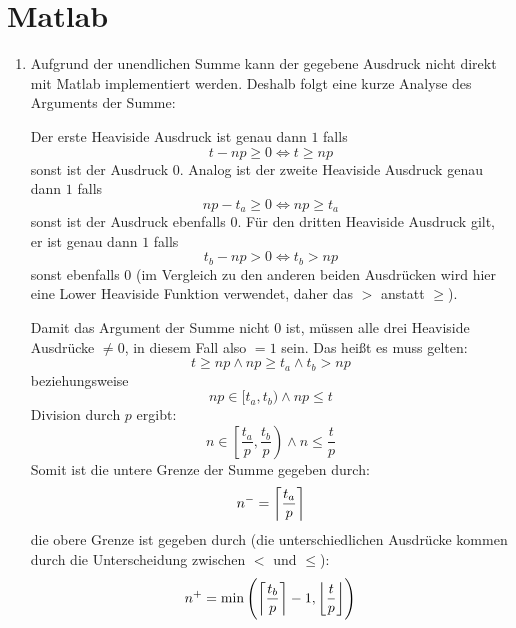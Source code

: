 \documentclass[DIN, pagenumber=false, fontsize=11pt, parskip=half]{scrartcl}
\DeclarePairedDelimiter\ceil{\lceil}{\rceil}
\DeclarePairedDelimiter\floor{\lfloor}{\rfloor}
\begin{document}
    \section{Matlab}
    \begin{enumerate}[label=\alph*)]
        \item Aufgrund der unendlichen Summe kann der gegebene Ausdruck nicht direkt
            mit Matlab implementiert werden. Deshalb folgt eine kurze Analyse
            des Arguments der Summe:

            Der erste Heaviside Ausdruck ist genau dann $1$ falls
            \begin{equation}
                t - np \geq 0 \Leftrightarrow t \geq n p
            \end{equation}
            sonst ist der Ausdruck $0$. Analog ist der zweite Heaviside Ausdruck
            genau dann $1$ falls
            \begin{equation}
                np -t_a \geq 0 \Leftrightarrow np \geq t_a
            \end{equation}
            sonst ist der Ausdruck ebenfalls $0$. Für den dritten Heaviside Ausdruck
            gilt, er ist genau dann $1$ falls
            \begin{equation}
                t_b - n p > 0 \Leftrightarrow t_b > n p
            \end{equation}
            sonst ebenfalls $0$ (im Vergleich zu den anderen beiden Ausdrücken
            wird hier eine Lower Heaviside Funktion verwendet, daher das $>$ anstatt
            $\geq$).

            Damit das Argument der Summe nicht $0$ ist, müssen alle drei Heaviside
            Ausdrücke $\neq 0$, in diesem Fall also $=1$ sein. Das heißt es muss
            gelten:
            \begin{equation}
                t \geq n p \land np \geq t_a \land t_b > n p
            \end{equation}
            beziehungsweise
            \begin{equation}
                np \in [t_a, t_b) \land np \leq t
            \end{equation}
            Division durch $p$ ergibt:
            \begin{equation}
                n \in \left[ \frac{t_a}{p}, \frac{t_b}{p}\right) \land n \leq \frac{t}{p} 
            \end{equation}
            Somit ist die untere Grenze der Summe gegeben durch:
            \begin{equation}
                n^- = \ceil*{ \frac{t_a}{p} }
            \end{equation}
            die obere Grenze ist gegeben durch (die unterschiedlichen Ausdrücke
            kommen durch die Unterscheidung zwischen $<$ und $\leq$):
            \begin{equation}
                n^+ = \min \left(
                    \ceil*{\frac{t_b}{p}} - 1, 
                    \floor*{\frac{t}{p}}
                 \right)
            \end{equation}
            

\end{enumerate}
\end{document}

